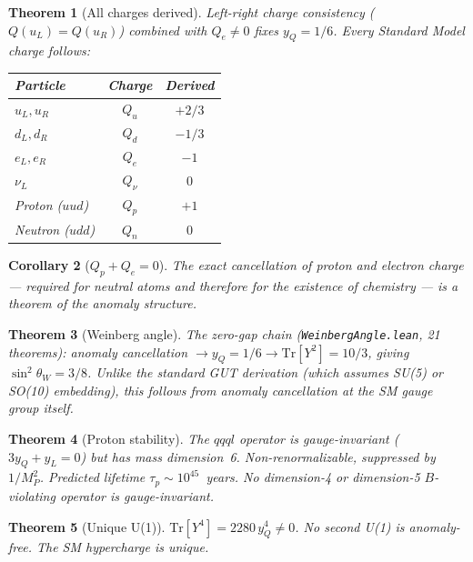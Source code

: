 \documentclass[11pt,letterpaper]{article}
\newtheorem{theorem}{Theorem}
\newtheorem{corollary}[theorem]{Corollary}
\begin{document}
\begin{theorem}[All charges derived]
\label{thm:electron}
Left-right charge consistency ($Q(u_L) = Q(u_R)$) combined with
$Q_e \neq 0$ fixes $y_Q = 1/6$.  Every Standard Model charge follows:

\begin{center}
\begin{tabular}{@{}lcc@{}}
\toprule
Particle & Charge & Derived \\
\midrule
$u_L, u_R$ & $Q_u$ & $+2/3$ \\
$d_L, d_R$ & $Q_d$ & $-1/3$ \\
$e_L, e_R$ & $Q_e$ & $-1$ \\
$\nu_L$ & $Q_\nu$ & $0$ \\
Proton ($uud$) & $Q_p$ & $+1$ \\
Neutron ($udd$) & $Q_n$ & $0$ \\
\bottomrule
\end{tabular}
\end{center}
\end{theorem}

\begin{corollary}[$Q_p + Q_e = 0$]
The exact cancellation of proton and electron charge --- required for
neutral atoms and therefore for the existence of chemistry --- is a
theorem of the anomaly structure.
\end{corollary}

\begin{theorem}[Weinberg angle]
\label{thm:weinberg}
The zero-gap chain
(\texttt{Weinberg\-Angle.lean}, 21 theorems):
anomaly cancellation $\to y_Q = 1/6 \to
\mathrm{Tr}[Y^2] = 10/3$, giving
$\sin^2\theta_W = 3/8$.
Unlike the standard GUT derivation (which assumes SU(5) or SO(10)
embedding), this follows from anomaly cancellation at the SM gauge
group itself.
\end{theorem}

\begin{theorem}[Proton stability]
\label{thm:proton}
The $qqql$ operator is gauge-invariant ($3y_Q + y_L = 0$) but has
mass dimension~6.  Non-renormalizable, suppressed by $1/M_P^2$.
Predicted lifetime $\tau_p \sim 10^{45}$~years.  No dimension-4 or
dimension-5 $B$-violating operator is gauge-invariant.
\end{theorem}

\begin{theorem}[Unique U(1)]
\label{thm:nozprime}
$\mathrm{Tr}[Y^4] = 2280\,y_Q^4 \neq 0$.  No second U(1) is
anomaly-free.  The SM hypercharge is unique.
\end{theorem}
\end{document}
